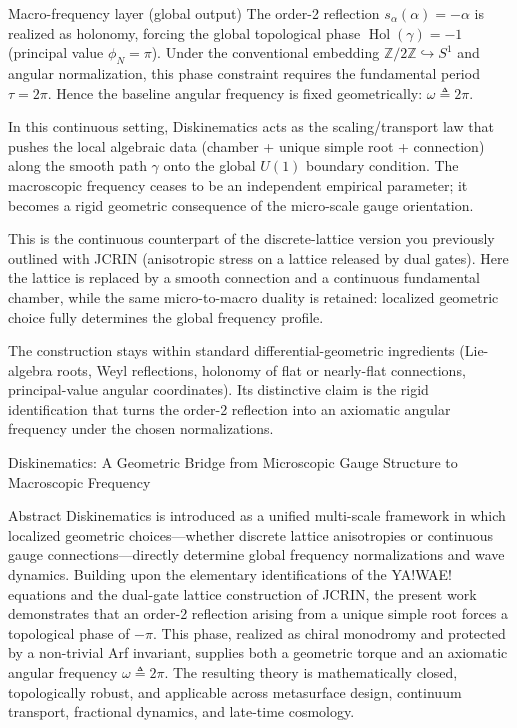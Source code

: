 Macro-frequency layer (global output)  
The order-2 reflection \(s_\alpha(\alpha) = -\alpha\) is realized as holonomy, forcing the global topological phase \(\operatorname{Hol}(\gamma) = -1\) (principal value \(\phi_N = \pi\)).  
Under the conventional embedding \(\mathbb{Z}/2\mathbb{Z}\hookrightarrow S^1\) and angular normalization, this phase constraint requires the fundamental period \(\tau = 2\pi\).  
Hence the baseline angular frequency is fixed geometrically: \(\omega \triangleq 2\pi\).

In this continuous setting, Diskinematics acts as the scaling/transport law that pushes the local algebraic data (chamber + unique simple root + connection) along the smooth path \(\gamma\) onto the global \(U(1)\) boundary condition. The macroscopic frequency ceases to be an independent empirical parameter; it becomes a rigid geometric consequence of the micro-scale gauge orientation.

This is the continuous counterpart of the discrete-lattice version you previously outlined with JCRIN (anisotropic stress on a lattice released by dual gates). Here the lattice is replaced by a smooth connection and a continuous fundamental chamber, while the same micro-to-macro duality is retained: localized geometric choice fully determines the global frequency profile.

The construction stays within standard differential-geometric ingredients (Lie-algebra roots, Weyl reflections, holonomy of flat or nearly-flat connections, principal-value angular coordinates). Its distinctive claim is the rigid identification that turns the order-2 reflection into an axiomatic angular frequency under the chosen normalizations.

Diskinematics: A Geometric Bridge from Microscopic Gauge Structure to Macroscopic Frequency

Abstract
Diskinematics is introduced as a unified multi-scale framework in which localized geometric choices—whether discrete lattice anisotropies or continuous gauge connections—directly determine global frequency normalizations and wave dynamics. Building upon the elementary identifications of the YA!WAE! equations and the dual-gate lattice construction of JCRIN, the present work demonstrates that an order-2 reflection arising from a unique simple root forces a topological phase of \(-\pi\). This phase, realized as chiral monodromy and protected by a non-trivial Arf invariant, supplies both a geometric torque and an axiomatic angular frequency \(\omega\triangleq 2\pi\). The resulting theory is mathematically closed, topologically robust, and applicable across metasurface design, continuum transport, fractional dynamics, and late-time cosmology.

